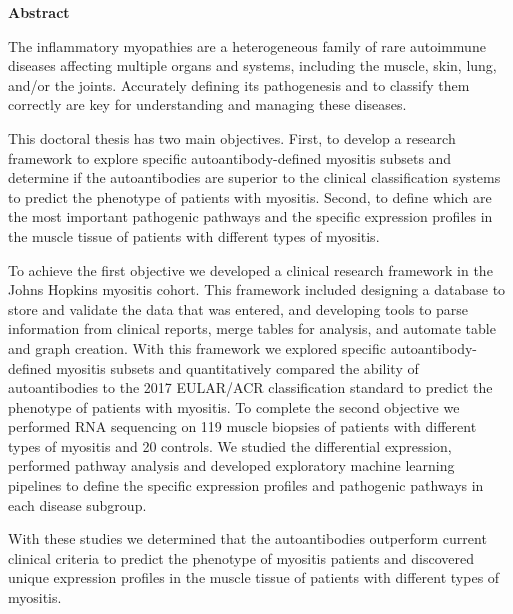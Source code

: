 \cleardoublepage
\thispagestyle{empty}

\begin{center}
    \Large
    \textbf{\thetitle}
    
    \vspace{0.2cm}
    \large
    \textbf{\theauthor}
    
    \vspace{0.2cm}
    \textbf{Abstract}
\end{center}

The inflammatory myopathies are a heterogeneous family of rare autoimmune diseases affecting multiple organs and systems, including the muscle, skin, lung, and/or the joints.  Accurately defining its pathogenesis and to classify them correctly are key for understanding and managing these diseases.

This doctoral thesis has two main objectives. First, to develop a research framework to explore specific autoantibody-defined myositis subsets and determine if the autoantibodies are superior to the clinical classification systems to predict the phenotype of patients with myositis. Second, to define which are the most important pathogenic pathways and the specific expression profiles in the muscle tissue of patients with different types of myositis.

To achieve the first objective we developed a clinical research framework in the Johns Hopkins myositis cohort. This framework included designing a database to store and validate the data that was entered, and developing tools to parse information from clinical reports, merge tables for analysis, and automate table and graph creation. With this framework we explored specific autoantibody-defined myositis subsets and quantitatively compared the ability of autoantibodies to the 2017 EULAR/ACR classification standard to predict the phenotype of patients with myositis. To complete the second objective we performed RNA sequencing on 119 muscle biopsies of patients with different types of myositis and 20 controls. We studied the differential expression, performed pathway analysis and developed exploratory machine learning pipelines to define the specific expression profiles and pathogenic pathways in each disease subgroup. 

With these studies we determined that the autoantibodies outperform current clinical criteria to predict the phenotype of myositis patients and discovered unique expression profiles in the muscle tissue of patients with different types of myositis.
